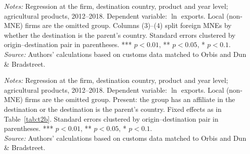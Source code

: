 \documentclass[11pt,a4paper]{article}
\newcommand{\srcnote}{\textit{Source:} Authors' calculations based on customs data matched to Orbis and Dun \& Bradstreet.}
\begin{document}
\begin{table}[H]\centering\small%
  \caption{Distance and Firm Agricultural Exports: Foreign and Domestic Multinationals}%
  \label{tab:ap_dist}%
  \par\vspace{3pt}%
  \begin{minipage}{0.95\textwidth}\footnotesize %
  \textit{Notes:} Regression at the firm, destination country, product and year level; agricultural products, 2012--2018. Dependent variable: $\ln$ exports. Local (non-MNE) firms are the omitted group. Columns (3)--(4) split foreign MNEs by whether the destination is the parent's country. Standard errors clustered by origin--destination pair in parentheses. *** $p<0.01$, ** $p<0.05$, * $p<0.1$.\\[3pt]%
  \srcnote%
  \end{minipage}%
  \end{table}
\begin{table}[H]\centering\small%
  \caption{Distance and Firm Agricultural Exports: Multinationals by Presence at the Destination}%
  \label{tab:ap_dist_pres}%
  \par\vspace{3pt}%
  \begin{minipage}{0.95\textwidth}\footnotesize %
  \textit{Notes:} Regression at the firm, destination country, product and year level; agricultural products, 2012--2018. Dependent variable: $\ln$ exports. Local (non-MNE) firms are the omitted group. Present: the group has an affiliate in the destination or the destination is the parent's country. Fixed effects as in Table~\ref{tab:t2b}. Standard errors clustered by origin--destination pair in parentheses. *** $p<0.01$, ** $p<0.05$, * $p<0.1$.\\[3pt]%
  \srcnote%
  \end{minipage}%
  \end{table}
\end{document}
